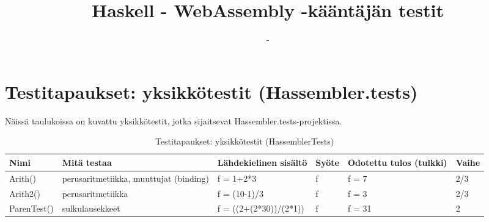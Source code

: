 \documentclass[11pt]{article} %
\title{Haskell - WebAssembly -kääntäjän testit}
\author{-}
\begin{document}
\maketitle


\section{Testitapaukset: yksikkötestit (Hassembler.tests)}

Näissä taulukoissa on kuvattu yksikkötestit, jotka sijaitsevat Hassembler.tests-projektissa.

\begin{table}[!htbp] %
\caption{Testitapaukset: yksikkötestit (HassemblerTests)}
\begin{tabular}{|p{3cm}|p{}|p{3cm}|p{}|p{3cm}|p{}|}
\hline
\textbf{Nimi} & \textbf{Mitä testaa} & \textbf{Lähdekielinen sisältö} & \textbf{Syöte}& \textbf{Odotettu tulos (tulkki)}  & \textbf{Vaihe} \\ \hline
 Arith()             & perus\-aritmetiikka, muuttujat (binding)         & f = 1+2*3  & f  & f = 7                                  &  2/3              \\ \hline
 Arith2()             & perus\-aritmetiikka         & f = (10-1)/3  & f  & f = 3                                  &  2/3              \\ \hline
 ParenTest()              & sulkulausekkeet    &  f = ((2+(2*30))/(2*1))             &  f     & f = 31     &  2  \\ \hline             


\end{tabular}
\end{table}
\end{document}
